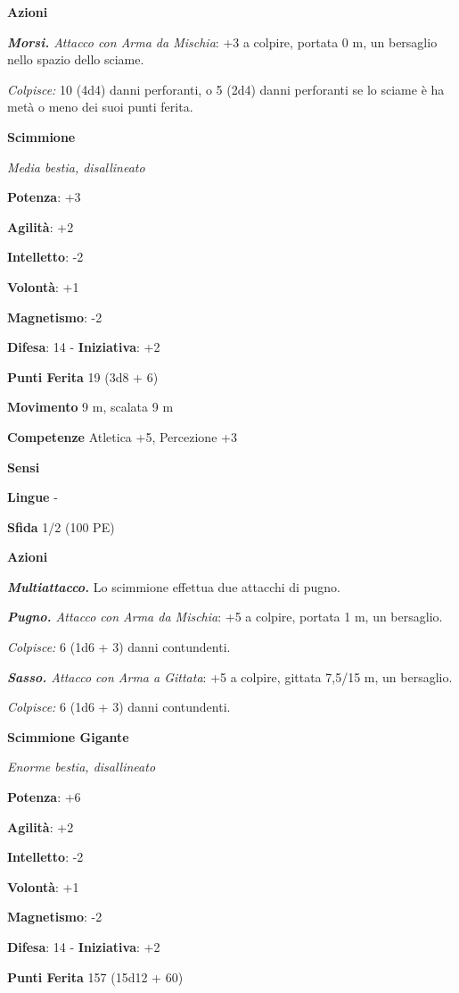 \begin{multicols}{2}
\smallskip\textbf{Azioni}

\emph{\textbf{Morsi.} Attacco con Arma da Mischia}: +3 a colpire,
portata 0 m, un bersaglio nello spazio dello sciame.

\emph{Colpisce:} 10 (4d4) danni perforanti, o 5 (2d4) danni perforanti
se lo sciame è ha metà o meno dei suoi punti ferita.

\textbf{Scimmione}

\emph{Media bestia, disallineato}

\textbf{Potenza}: +3

\textbf{Agilità}: +2

\textbf{Intelletto}: -2

\textbf{Volontà}: +1

\textbf{Magnetismo}: -2

\textbf{Difesa}: 14 - \textbf{Iniziativa}: +2

\textbf{Punti Ferita} 19 (3d8 + 6)

\textbf{Movimento} 9 m, scalata 9 m

\textbf{Competenze} Atletica +5, Percezione +3

\textbf{Sensi} 

\textbf{Lingue} -

\textbf{Sfida} 1/2 (100 PE)\smallskip

\smallskip\textbf{Azioni}

\emph{\textbf{Multiattacco.}} Lo scimmione effettua due attacchi di
pugno.

\emph{\textbf{Pugno.} Attacco con Arma da Mischia}: +5 a colpire,
portata 1 m, un bersaglio.

\emph{Colpisce:} 6 (1d6 + 3) danni contundenti.

\emph{\textbf{Sasso.} Attacco con Arma a Gittata}: +5 a colpire, gittata
7,5/15 m, un bersaglio.

\emph{Colpisce:} 6 (1d6 + 3) danni contundenti.

\textbf{Scimmione Gigante}

\emph{Enorme bestia, disallineato}

\textbf{Potenza}: +6

\textbf{Agilità}: +2

\textbf{Intelletto}: -2

\textbf{Volontà}: +1

\textbf{Magnetismo}: -2

\textbf{Difesa}: 14 - \textbf{Iniziativa}: +2

\textbf{Punti Ferita} 157 (15d12 + 60)


\end{multicols}
